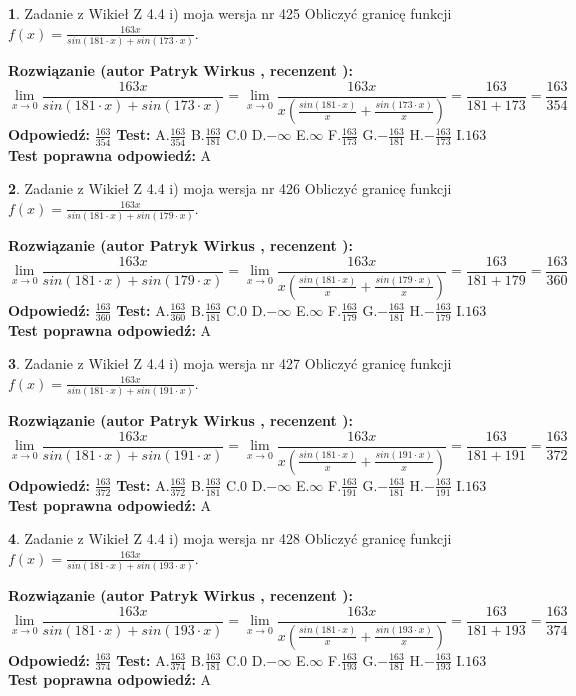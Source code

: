 \documentclass[12pt, a4paper]{article}
\theoremstyle{definition} %
\newtheorem{zad}{}
\newcommand{\zadStart}[1]{\begin{zad}#1\newline}
\newcommand{\zadStop}{\end{zad}}
\newcommand{\rozwStart}[2]{\noindent \textbf{Rozwiązanie (autor #1 , recenzent #2): }\newline}
\newcommand{\rozwStop}{\newline}
\newcommand{\odpStart}{\noindent \textbf{Odpowiedź:}\newline}
\newcommand{\odpStop}{\newline}
\newcommand{\testStart}{\noindent \textbf{Test:}\newline}
\newcommand{\testStop}{\newline}
\newcommand{\kluczStart}{\noindent \textbf{Test poprawna odpowiedź:}\newline}
\newcommand{\kluczStop}{\newline}
\begin{document}
\zadStart{Zadanie z Wikieł Z 4.4 i) moja wersja nr 425}
Obliczyć granicę funkcji $f(x)=\frac{163x}{sin(181\cdot x) +sin(173\cdot x)}$.
\zadStop
\rozwStart{Patryk Wirkus}{}
$$\lim\limits_{x\to 0}\frac{163x}{sin(181\cdot x) +sin(173\cdot x)}=\lim\limits_{x\to 0}\frac{163x}{x(\frac{sin(181\cdot x)}{x}+\frac{sin(173\cdot x)}{x})}=\frac{163}{181+173} = \frac{163}{354}$$
\rozwStop
\odpStart
$\frac{163}{354}$
\odpStop
\testStart
A.$\frac{163}{354}$
B.$\frac{163}{181}$
C.$0$
D.$-\infty$
E.$\infty$
F.$\frac{163}{173}$
G.$-\frac{163}{181}$
H.$-\frac{163}{173}$
I.$163$
\testStop
\kluczStart
A
\kluczStop



\zadStart{Zadanie z Wikieł Z 4.4 i) moja wersja nr 426}
Obliczyć granicę funkcji $f(x)=\frac{163x}{sin(181\cdot x) +sin(179\cdot x)}$.
\zadStop
\rozwStart{Patryk Wirkus}{}
$$\lim\limits_{x\to 0}\frac{163x}{sin(181\cdot x) +sin(179\cdot x)}=\lim\limits_{x\to 0}\frac{163x}{x(\frac{sin(181\cdot x)}{x}+\frac{sin(179\cdot x)}{x})}=\frac{163}{181+179} = \frac{163}{360}$$
\rozwStop
\odpStart
$\frac{163}{360}$
\odpStop
\testStart
A.$\frac{163}{360}$
B.$\frac{163}{181}$
C.$0$
D.$-\infty$
E.$\infty$
F.$\frac{163}{179}$
G.$-\frac{163}{181}$
H.$-\frac{163}{179}$
I.$163$
\testStop
\kluczStart
A
\kluczStop



\zadStart{Zadanie z Wikieł Z 4.4 i) moja wersja nr 427}
Obliczyć granicę funkcji $f(x)=\frac{163x}{sin(181\cdot x) +sin(191\cdot x)}$.
\zadStop
\rozwStart{Patryk Wirkus}{}
$$\lim\limits_{x\to 0}\frac{163x}{sin(181\cdot x) +sin(191\cdot x)}=\lim\limits_{x\to 0}\frac{163x}{x(\frac{sin(181\cdot x)}{x}+\frac{sin(191\cdot x)}{x})}=\frac{163}{181+191} = \frac{163}{372}$$
\rozwStop
\odpStart
$\frac{163}{372}$
\odpStop
\testStart
A.$\frac{163}{372}$
B.$\frac{163}{181}$
C.$0$
D.$-\infty$
E.$\infty$
F.$\frac{163}{191}$
G.$-\frac{163}{181}$
H.$-\frac{163}{191}$
I.$163$
\testStop
\kluczStart
A
\kluczStop



\zadStart{Zadanie z Wikieł Z 4.4 i) moja wersja nr 428}
Obliczyć granicę funkcji $f(x)=\frac{163x}{sin(181\cdot x) +sin(193\cdot x)}$.
\zadStop
\rozwStart{Patryk Wirkus}{}
$$\lim\limits_{x\to 0}\frac{163x}{sin(181\cdot x) +sin(193\cdot x)}=\lim\limits_{x\to 0}\frac{163x}{x(\frac{sin(181\cdot x)}{x}+\frac{sin(193\cdot x)}{x})}=\frac{163}{181+193} = \frac{163}{374}$$
\rozwStop
\odpStart
$\frac{163}{374}$
\odpStop
\testStart
A.$\frac{163}{374}$
B.$\frac{163}{181}$
C.$0$
D.$-\infty$
E.$\infty$
F.$\frac{163}{193}$
G.$-\frac{163}{181}$
H.$-\frac{163}{193}$
I.$163$
\testStop
\kluczStart
A
\kluczStop
\end{document}

